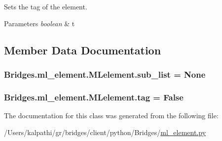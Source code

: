 Sets the tag of the element. 


\begin{DoxyParams}{Parameters}
{\em boolean} & t \\
\hline
\end{DoxyParams}


\subsection{Member Data Documentation}
\hypertarget{class_bridges_1_1ml__element_1_1_m_lelement_a08b50da0d31100920122df7df01c8abc}{}
\subsubsection[{sub\+\_\+list}]{\setlength{\rightskip}{0pt plus 5cm}Bridges.\+ml\+\_\+element.\+M\+Lelement.\+sub\+\_\+list = None\hspace{0.3cm}{\ttfamily [static]}}\label{class_bridges_1_1ml__element_1_1_m_lelement_a08b50da0d31100920122df7df01c8abc}
\hypertarget{class_bridges_1_1ml__element_1_1_m_lelement_aa9891ba8d6172b9ed65981f26036c213}{}
\subsubsection[{tag}]{\setlength{\rightskip}{0pt plus 5cm}Bridges.\+ml\+\_\+element.\+M\+Lelement.\+tag = False\hspace{0.3cm}{\ttfamily [static]}}\label{class_bridges_1_1ml__element_1_1_m_lelement_aa9891ba8d6172b9ed65981f26036c213}


The documentation for this class was generated from the following file\+:\begin{DoxyCompactItemize}
\item 
/\+Users/kalpathi/gr/bridges/client/python/\+Bridges/\hyperlink{ml__element_8py}{ml\+\_\+element.\+py}\end{DoxyCompactItemize}
